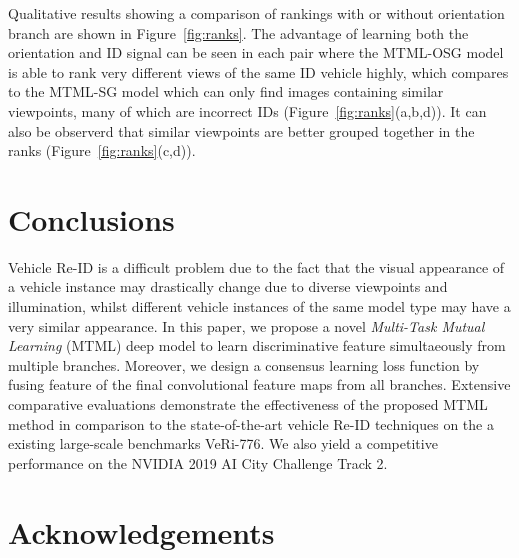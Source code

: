 \documentclass[10pt,twocolumn,letterpaper]{article}
\begin{document}

Qualitative results showing a comparison of rankings with or without orientation branch are shown in Figure~\ref{fig:ranks}. The advantage of learning both the orientation and ID signal can
be seen in each pair where the MTML-OSG model is able to rank very different views of the same ID vehicle highly, which compares to the MTML-SG model which can only find images containing similar viewpoints, many of which are incorrect IDs (Figure~\ref{fig:ranks}(a,b,d)). It can also be observerd that similar viewpoints are better grouped together in the ranks (Figure~\ref{fig:ranks}(c,d)).




%

\section{Conclusions}
Vehicle Re-ID is a difficult problem due to the fact that the visual appearance of
a vehicle instance may drastically change due to diverse
viewpoints and illumination, whilst different vehicle instances of the same
model type may have a very similar appearance.
%
In this paper, we propose a novel {\em Multi-Task Mutual Learning} (MTML) deep model
to learn discriminative feature simultaeously from multiple branches.
%
Moreover, we design a consensus learning loss function by fusing feature of the final convolutional feature maps from all branches.
%
Extensive comparative evaluations demonstrate the effectiveness of the
proposed MTML method in comparison to the state-of-the-art vehicle Re-ID techniques on the a existing large-scale benchmarks VeRi-776.
We also yield a competitive performance on the NVIDIA 2019 AI City Challenge Track 2.

\section{Acknowledgements}



{\small


}
\end{document}
